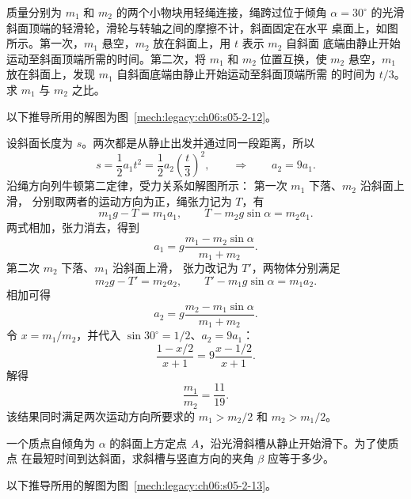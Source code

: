 {\begin{origexamplebox}{}\label{ch06:ex:s05-2-12}
质量分别为 $m_1$ 和 $m_2$ 的两个小物块用轻绳连接，绳跨过位于倾角
$\alpha=30^\circ$ 的光滑斜面顶端的轻滑轮，滑轮与转轴之间的摩擦不计，斜面固定在水平
桌面上，如图所示。第一次，$m_1$ 悬空，$m_2$ 放在斜面上，用 $t$ 表示 $m_2$ 自斜面
底端由静止开始运动至斜面顶端所需的时间。第二次，将 $m_1$ 和 $m_2$ 位置互换，使
$m_2$ 悬空，$m_1$ 放在斜面上，发现 $m_1$ 自斜面底端由静止开始运动至斜面顶端所需
的时间为 $t/3$。求 $m_1$ 与 $m_2$ 之比。
\probdiagTwoTwelve
\end{origexamplebox}

\begin{xesolution}
以下推导所用的解图为图~\ref{mech:legacy:ch06:s05-2-12}。

设斜面长度为 $s$。两次都是从静止出发并通过同一段距离，所以
\[
 s=\frac12a_1t^2
   =\frac12a_2\left(\frac t3\right)^2,
 \qquad\Rightarrow\qquad a_2=9a_1.
\]
沿绳方向列牛顿第二定律，受力关系如解图所示：
\soldiagTwoTwelve
第一次 $m_1$ 下落、$m_2$ 沿斜面上滑，
分别取两者的运动方向为正，绳张力记为 $T$，有
\[
 m_1g-T=m_1a_1,\qquad T-m_2g\sin\alpha=m_2a_1.
\]
两式相加，张力消去，得到
\[
 a_1=g\frac{m_1-m_2\sin\alpha}{m_1+m_2}.
\]
第二次 $m_2$ 下落、$m_1$ 沿斜面上滑，
张力改记为 $T'$，两物体分别满足
\[
 m_2g-T'=m_2a_2,\qquad T'-m_1g\sin\alpha=m_1a_2.
\]
相加可得
\[
 a_2=g\frac{m_2-m_1\sin\alpha}{m_1+m_2}.
\]
令 $x=m_1/m_2$，并代入 $\sin30^\circ=1/2$、$a_2=9a_1$：
\[
 \frac{1-x/2}{x+1}=9\frac{x-1/2}{x+1}.
\]
解得
\[
 \boxed{\frac{m_1}{m_2}=\frac{11}{19}}.
\]
该结果同时满足两次运动方向所要求的 $m_1>m_2/2$ 和 $m_2>m_1/2$。
\end{xesolution}

\begin{origexamplebox}{}\label{ch06:ex:s05-2-13}
一个质点自倾角为 $\alpha$ 的斜面上方定点 $A$，沿光滑斜槽从静止开始滑下。为了使质点
在最短时间到达斜面，求斜槽与竖直方向的夹角 $\beta$ 应等于多少。
\probdiagTwoThirteen
\end{origexamplebox}

\begin{xesolution}
以下推导所用的解图为图~\ref{mech:legacy:ch06:s05-2-13}。


\end{xesolution}}
